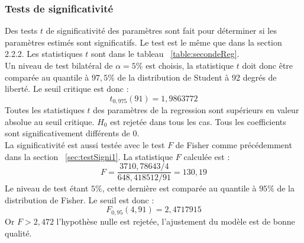 \documentclass[12pt]{article}
\begin{document}
\subsubsection{Tests de significativité}
Des tests $t$ de significativité des paramètres sont fait pour déterminer si les paramètres estimés sont significatifs. Le test est le même que dans la
section 2.2.2. Les statistiques $t$ sont dans le tableau ~\ref{table:secondeReg}.
\\
Un niveau de test bilatéral de $\alpha = 5 \%$ est choisis, la statistique  $t$ doit donc être comparée au quantile à  $97,5\%$ de la distribution de
Student à 92 degrés de liberté. Le seuil critique est donc :
\begin{equation*}
t_{0,975}(91) = 1,9863772
\end{equation*}
Toutes les statistiques $t$ des paramètres de la regression sont supérieurs en valeur absolue au seuil critique. $H_0$ est rejetée dans tous les cas.
Tous les coefficients sont significativement différents de 0.
\\
La significativité est aussi testée avec le test $F$ de Fisher comme précédemment dans la section ~\ref{sec:testSigni1}. La statistique $F$ calculée est :
\begin{equation*}
    F =  \frac{3710,78643/4}{648,418512/91} = 130,19
\end{equation*}
Le niveau de test étant $5\%$, cette dernière est comparée au quantile à $95\%$ de la distribution de Fisher. Le seuil est donc :
\begin{equation*}
    F_{0,95}(4,91) = 2,4717915
\end{equation*}
Or $F > 2,472$ l'hypothèse nulle est rejetée, l'ajustement du modèle est de bonne qualité.
\end{document}
